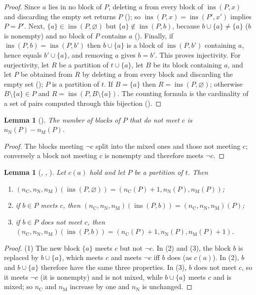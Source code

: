 \documentclass[11pt]{amsart}
\theoremstyle{plain}
\newtheorem{lemma}[theorem]{Lemma}
\theoremstyle{definition}
\newcommand{\nC}{n_{\mathrm C}}
\newcommand{\nN}{n_{\mathrm N}}
\newcommand{\nM}{n_{\mathrm M}}
\newcommand{\ins}{\operatorname{ins}}
\begin{document}
\begin{proof}
Since $a$ lies in no block of $P$, deleting $a$ from every block of $\ins(P,x)$ and discarding the empty set returns $P$ (); so $\ins(P,x)=\ins(P',x')$ implies $P=P'$.
Next, $\{a\}\in\ins(P,\varnothing)$ but $\{a\}\notin\ins(P,b)$, because $b\cup\{a\}\ne\{a\}$ ($b$ is nonempty) and no block of $P$ contains $a$ ().
Finally, if $\ins(P,b)=\ins(P,b')$ then $b\cup\{a\}$ is a block of $\ins(P,b')$ containing $a$, hence equals $b'\cup\{a\}$, and removing $a$ gives $b=b'$. This proves injectivity.
For surjectivity, let $R$ be a partition of $t\cup\{a\}$, let $B$ be its block containing $a$, and let $P$ be obtained from $R$ by deleting $a$ from every block and discarding the empty set (); $P$ is a partition of $t$.
If $B=\{a\}$ then $R=\ins(P,\varnothing)$; otherwise $B\setminus\{a\}\in P$ and $R=\ins(P,B\setminus\{a\})$.
The counting formula is the cardinality of a set of pairs computed through this bijection ().
\end{proof}

\begin{lemma}[]\label{lem:notC}
The number of blocks of $P$ that do not meet $c$ is $\nN(P)-\nM(P)$.
\end{lemma}

\begin{proof}
The blocks meeting $\neg c$ split into the mixed ones and those not meeting $c$; conversely a block not meeting $c$ is nonempty and therefore meets $\neg c$.
\end{proof}

\begin{lemma}[, , ]\label{lem:stats}
Let $c(a)$ hold and let $P$ be a partition of $t$. Then
\begin{enumerate}
\item $(\nC,\nN,\nM)(\ins(P,\varnothing))=(\nC(P)+1,\nN(P),\nM(P))$;
\item if $b\in P$ meets $c$, then $(\nC,\nN,\nM)(\ins(P,b))=(\nC,\nN,\nM)(P)$;
\item if $b\in P$ does not meet $c$, then $(\nC,\nN,\nM)(\ins(P,b))=(\nC(P)+1,\nN(P),\nM(P)+1)$.
\end{enumerate}
\end{lemma}

\begin{proof}
(1) The new block $\{a\}$ meets $c$ but not $\neg c$.
In (2) and (3), the block $b$ is replaced by $b\cup\{a\}$, which meets $c$ and meets $\neg c$ iff $b$ does (as $c(a)$).
In (2), $b$ and $b\cup\{a\}$ therefore have the same three properties.
In (3), $b$ does not meet $c$, so it meets $\neg c$ (it is nonempty) and is not mixed, while $b\cup\{a\}$ meets $c$ and is mixed; so $\nC$ and $\nM$ increase by one and $\nN$ is unchanged.
\end{proof}
\end{document}
